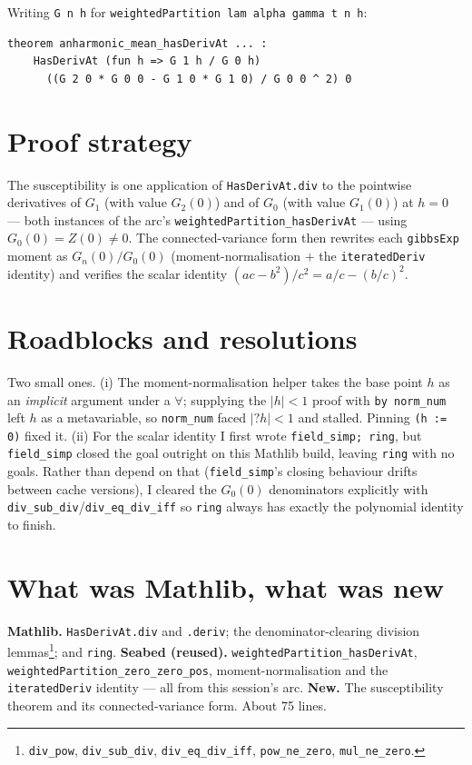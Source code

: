 \documentclass[11pt]{article}
\begin{document}
Writing \texttt{G n h} for \texttt{weightedPartition lam alpha gamma t n h}:
\begin{verbatim}
theorem anharmonic_mean_hasDerivAt ... :
    HasDerivAt (fun h => G 1 h / G 0 h)
      ((G 2 0 * G 0 0 - G 1 0 * G 1 0) / G 0 0 ^ 2) 0
\end{verbatim}

\section{Proof strategy}

The susceptibility is one application of \texttt{HasDerivAt.div} to the
pointwise derivatives of $G_1$ (with value $G_2(0)$) and of $G_0$ (with
value $G_1(0)$) at $h=0$ --- both instances of the arc's
\texttt{weightedPartition\_hasDerivAt} --- using $G_0(0)=Z(0)\neq0$. The
connected-variance form then rewrites each \texttt{gibbsExp} moment as
$G_n(0)/G_0(0)$ (moment-normalisation $+$ the \texttt{iteratedDeriv}
identity) and verifies the scalar identity
$(ac-b^2)/c^2 = a/c-(b/c)^2$.

\section{Roadblocks and resolutions}

Two small ones. (i) The moment-normalisation helper takes the base point
$h$ as an \emph{implicit} argument under a $\forall$; supplying the
$|h|<1$ proof with \texttt{by norm\_num} left $h$ as a metavariable, so
\texttt{norm\_num} faced $|?h|<1$ and stalled. Pinning \texttt{(h := 0)}
fixed it. (ii) For the scalar identity I first wrote \texttt{field\_simp;
ring}, but \texttt{field\_simp} closed the goal outright on this Mathlib
build, leaving \texttt{ring} with no goals. Rather than depend on that
(\texttt{field\_simp}'s closing behaviour drifts between cache versions),
I cleared the $G_0(0)$ denominators explicitly with
\texttt{div\_sub\_div}/\texttt{div\_eq\_div\_iff} so \texttt{ring} always
has exactly the polynomial identity to finish.

\section{What was Mathlib, what was new}

\textbf{Mathlib.} \texttt{HasDerivAt.div} and \texttt{.deriv}; the
denominator-clearing division lemmas\footnote{\texttt{div\_pow},
\texttt{div\_sub\_div}, \texttt{div\_eq\_div\_iff}, \texttt{pow\_ne\_zero},
\texttt{mul\_ne\_zero}.}; and \texttt{ring}.
\textbf{Seabed (reused).} \texttt{weightedPartition\_hasDerivAt},
\texttt{weightedPartition\_zero\_zero\_pos}, moment-normalisation and the
\texttt{iteratedDeriv} identity --- all from this session's arc.
\textbf{New.} The susceptibility theorem and its connected-variance form.
About 75 lines.
\end{document}

